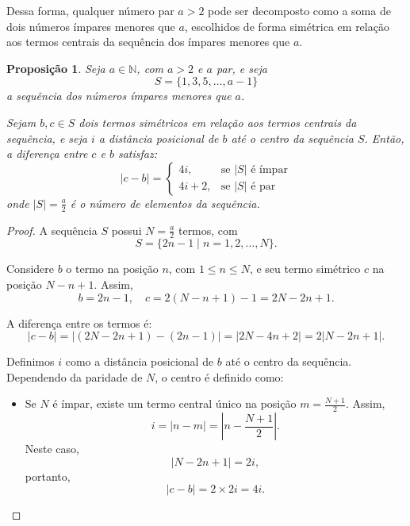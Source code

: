 \documentclass[a4paper,11pt]{article}
\newtheorem{proposition}[theorem]{Proposição}
\theoremstyle{definition}
\theoremstyle{remark}
\begin{document}
\begin{otherlanguage}{brazil}
	
	Dessa forma, qualquer número par $a > 2$ pode ser decomposto como a soma de dois números ímpares menores que $a$, escolhidos de forma simétrica em relação aos termos centrais da sequência dos ímpares menores que $a$.
		
	\vspace{1cm}
	
	\begin{proposition}\label{prop:distancia_simetrica}
		Seja $a \in \mathbb{N}$, com $a > 2$ e $a$ par, e seja
		\[
		S = \{1, 3, 5, \dotsc, a - 1\}
		\]
		a sequência dos números ímpares menores que $a$.
		
		Sejam $b, c \in S$ dois termos simétricos em relação aos termos centrais da sequência, e seja $i$ a distância posicional de $b$ até o centro da sequência $S$. Então, a diferença entre $c$ e $b$ satisfaz:
		\[
		|c - b| =
		\begin{cases}
			4i, & \text{se } |S| \text{ é ímpar} \\
			4i + 2, & \text{se } |S| \text{ é par}
		\end{cases}
		\]
		onde $|S| = \frac{a}{2}$ é o número de elementos da sequência.
	\end{proposition}
	
	\begin{proof}
		A sequência $S$ possui $N = \frac{a}{2}$ termos, com
		\[
		S = \{2n - 1 \mid n = 1, 2, \dotsc, N\}.
		\]
		
		Considere $b$ o termo na posição $n$, com $1 \leq n \leq N$, e seu termo simétrico $c$ na posição $N - n + 1$. Assim,
		\[
		b = 2n - 1, \quad c = 2(N - n + 1) - 1 = 2N - 2n + 1.
		\]
		
		A diferença entre os termos é:
		\[
		|c - b| = |(2N - 2n + 1) - (2n - 1)| = |2N - 4n + 2| = 2|N - 2n + 1|.
		\]
		
		Definimos $i$ como a distância posicional de $b$ até o centro da sequência. Dependendo da paridade de $N$, o centro é definido como:
		
		\begin{itemize}
			\item Se $N$ é ímpar, existe um termo central único na posição $m = \frac{N+1}{2}$. Assim,
			\[
			i = |n - m| = \left| n - \frac{N+1}{2} \right|.
			\]
			Neste caso,
			\[
			|N - 2n + 1| = 2i,
			\]
			portanto,
			\[
			|c - b| = 2 \times 2i = 4i.
			\]
			

\end{itemize}
\end{proof}
\end{otherlanguage}
\end{document}
